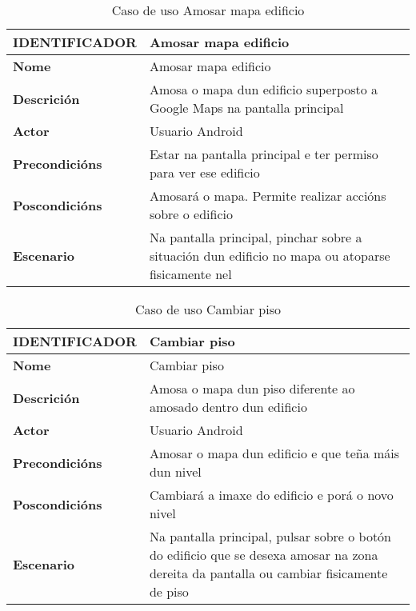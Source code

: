 \begin{table} [tbp]
	\begin{tabular}{|l|p{10cm}|}
		\hline 
		\textbf{IDENTIFICADOR}	& \textbf{Amosar mapa edificio} \\ 
		\hline 
		\textbf{Nome} & Amosar mapa edificio \\ 
		\hline 
		\textbf{Descrición} & Amosa o mapa dun edificio superposto a Google Maps na pantalla principal \\ 
		\hline 
		\textbf{Actor} & Usuario Android \\ 
		\hline 
		\textbf{Precondicións} & Estar na pantalla principal e ter permiso para ver ese edificio \\ 
		\hline 
		\textbf{Poscondicións} & Amosará o mapa. Permite realizar accións sobre o edificio \\ 
		\hline 
		\textbf{Escenario} & Na pantalla principal, pinchar sobre a situación dun edificio no mapa ou atoparse fisicamente nel \\ 
		\hline 
	\end{tabular}
	\caption{Caso de uso Amosar mapa edificio}
	\label{tab:cuAmosarMapaEdificio}
\end{table}

\begin{table} [tbp]
	\begin{tabular}{|l|p{10cm}|}
		\hline 
		\textbf{IDENTIFICADOR}	& \textbf{Cambiar piso} \\ 
		\hline 
		\textbf{Nome} & Cambiar piso \\ 
		\hline 
		\textbf{Descrición} & Amosa o mapa dun piso diferente ao amosado dentro dun edificio \\ 
		\hline 
		\textbf{Actor} & Usuario Android \\ 
		\hline 
		\textbf{Precondicións} & Amosar o mapa dun edificio e que teña máis dun nivel \\ 
		\hline 
		\textbf{Poscondicións} & Cambiará a imaxe do edificio e porá o novo nivel \\ 
		\hline 
		\textbf{Escenario} & Na pantalla principal, pulsar sobre o botón do edificio que se desexa amosar na zona dereita da pantalla ou cambiar fisicamente de piso \\ 
		\hline 
	\end{tabular}
	\caption{Caso de uso Cambiar piso}
	\label{tab:cuCambiarPiso}
\end{table}

